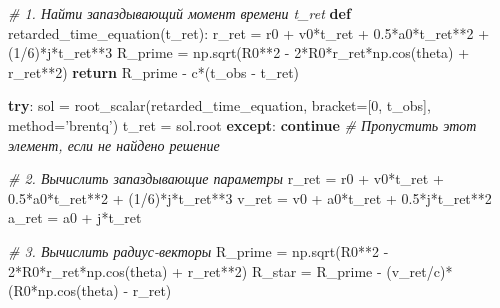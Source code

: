 \documentclass[11pt]{article}
\newenvironment{Shaded}{}{}
\newcommand{\KeywordTok}[1]{\textcolor[rgb]{0.00,0.44,0.13}{\textbf{{#1}}}}
\newcommand{\DecValTok}[1]{\textcolor[rgb]{0.25,0.63,0.44}{{#1}}}
\newcommand{\FloatTok}[1]{\textcolor[rgb]{0.25,0.63,0.44}{{#1}}}
\newcommand{\StringTok}[1]{\textcolor[rgb]{0.25,0.44,0.63}{{#1}}}
\newcommand{\CommentTok}[1]{\textcolor[rgb]{0.38,0.63,0.69}{\textit{{#1}}}}
\newcommand{\NormalTok}[1]{{#1}}
\newcommand{\ControlFlowTok}[1]{\textcolor[rgb]{0.00,0.44,0.13}{\textbf{{#1}}}}
\newcommand{\OperatorTok}[1]{\textcolor[rgb]{0.40,0.40,0.40}{{#1}}}
\begin{document}
\begin{Shaded}
\begin{Highlighting}[]
        \CommentTok{# 1. Найти запаздывающий момент времени t_ret}
        \KeywordTok{def}\NormalTok{ retarded_time_equation(t_ret):}
\NormalTok{            r_ret }\OperatorTok{=}\NormalTok{ r0 }\OperatorTok{+}\NormalTok{ v0}\OperatorTok{*}\NormalTok{t_ret }\OperatorTok{+} \FloatTok{0.5}\OperatorTok{*}\NormalTok{a0}\OperatorTok{*}\NormalTok{t_ret}\OperatorTok{**}\DecValTok{2} \OperatorTok{+}\NormalTok{ (}\DecValTok{1}\OperatorTok{/}\DecValTok{6}\NormalTok{)}\OperatorTok{*}\NormalTok{j}\OperatorTok{*}\NormalTok{t_ret}\OperatorTok{**}\DecValTok{3}
\NormalTok{            R_prime }\OperatorTok{=}\NormalTok{ np.sqrt(R0}\OperatorTok{**}\DecValTok{2} \OperatorTok{-} \DecValTok{2}\OperatorTok{*}\NormalTok{R0}\OperatorTok{*}\NormalTok{r_ret}\OperatorTok{*}\NormalTok{np.cos(theta) }\OperatorTok{+}\NormalTok{ r_ret}\OperatorTok{**}\DecValTok{2}\NormalTok{)}
            \ControlFlowTok{return}\NormalTok{ R_prime }\OperatorTok{-}\NormalTok{ c}\OperatorTok{*}\NormalTok{(t_obs }\OperatorTok{-}\NormalTok{ t_ret)}

        \ControlFlowTok{try}\NormalTok{:}
\NormalTok{            sol }\OperatorTok{=}\NormalTok{ root_scalar(retarded_time_equation, bracket}\OperatorTok{=}\NormalTok{[}\DecValTok{0}\NormalTok{, t_obs], method}\OperatorTok{=}\StringTok{'brentq'}\NormalTok{)}
\NormalTok{            t_ret }\OperatorTok{=}\NormalTok{ sol.root}
        \ControlFlowTok{except}\NormalTok{:}
            \ControlFlowTok{continue}  \CommentTok{# Пропустить этот элемент, если не найдено решение}

        \CommentTok{# 2. Вычислить запаздывающие параметры}
\NormalTok{        r_ret }\OperatorTok{=}\NormalTok{ r0 }\OperatorTok{+}\NormalTok{ v0}\OperatorTok{*}\NormalTok{t_ret }\OperatorTok{+} \FloatTok{0.5}\OperatorTok{*}\NormalTok{a0}\OperatorTok{*}\NormalTok{t_ret}\OperatorTok{**}\DecValTok{2} \OperatorTok{+}\NormalTok{ (}\DecValTok{1}\OperatorTok{/}\DecValTok{6}\NormalTok{)}\OperatorTok{*}\NormalTok{j}\OperatorTok{*}\NormalTok{t_ret}\OperatorTok{**}\DecValTok{3}
\NormalTok{        v_ret }\OperatorTok{=}\NormalTok{ v0 }\OperatorTok{+}\NormalTok{ a0}\OperatorTok{*}\NormalTok{t_ret }\OperatorTok{+} \FloatTok{0.5}\OperatorTok{*}\NormalTok{j}\OperatorTok{*}\NormalTok{t_ret}\OperatorTok{**}\DecValTok{2}
\NormalTok{        a_ret }\OperatorTok{=}\NormalTok{ a0 }\OperatorTok{+}\NormalTok{ j}\OperatorTok{*}\NormalTok{t_ret}

        \CommentTok{# 3. Вычислить радиус-векторы}
\NormalTok{        R_prime }\OperatorTok{=}\NormalTok{ np.sqrt(R0}\OperatorTok{**}\DecValTok{2} \OperatorTok{-} \DecValTok{2}\OperatorTok{*}\NormalTok{R0}\OperatorTok{*}\NormalTok{r_ret}\OperatorTok{*}\NormalTok{np.cos(theta) }\OperatorTok{+}\NormalTok{ r_ret}\OperatorTok{**}\DecValTok{2}\NormalTok{)}
\NormalTok{        R_star }\OperatorTok{=}\NormalTok{ R_prime }\OperatorTok{-}\NormalTok{ (v_ret}\OperatorTok{/}\NormalTok{c)}\OperatorTok{*}\NormalTok{(R0}\OperatorTok{*}\NormalTok{np.cos(theta) }\OperatorTok{-}\NormalTok{ r_ret)}


\end{Highlighting}
\end{Shaded}
\end{document}
